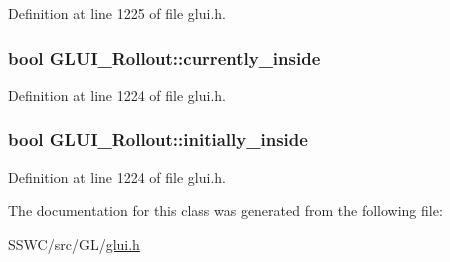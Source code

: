 Definition at line 1225 of file glui.\+h.

\hypertarget{class_g_l_u_i___rollout_aa9896aa7e1ee76ac8b4d84573da7e6fb}{
\subsubsection[{currently\+\_\+inside}]{\setlength{\rightskip}{0pt plus 5cm}bool G\+L\+U\+I\+\_\+\+Rollout\+::currently\+\_\+inside}}\label{class_g_l_u_i___rollout_aa9896aa7e1ee76ac8b4d84573da7e6fb}


Definition at line 1224 of file glui.\+h.

\hypertarget{class_g_l_u_i___rollout_ad9d35f15e7df49dc27fdc5ab571e0e17}{
\subsubsection[{initially\+\_\+inside}]{\setlength{\rightskip}{0pt plus 5cm}bool G\+L\+U\+I\+\_\+\+Rollout\+::initially\+\_\+inside}}\label{class_g_l_u_i___rollout_ad9d35f15e7df49dc27fdc5ab571e0e17}


Definition at line 1224 of file glui.\+h.



The documentation for this class was generated from the following file\+:\begin{DoxyCompactItemize}
\item 
S\+S\+W\+C/src/\+G\+L/\hyperlink{glui_8h}{glui.\+h}\end{DoxyCompactItemize}

